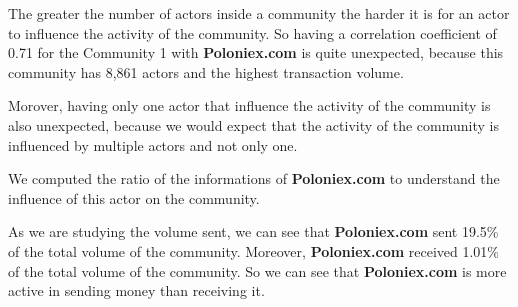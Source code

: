 \documentclass[a4paper, 12pt]{article}
\begin{document}
The greater the number of actors inside a community the harder it is for an actor to influence the activity of the community.
So having a correlation coefficient of 0.71 for the Community 1 with \textbf{Poloniex.com} is quite unexpected, 
because this community has 8,861 actors and the highest transaction volume. 

Morover, having only one actor that influence the activity of the community is also unexpected, because we would expect that
the activity of the community is influenced by multiple actors and not only one. 


\begin{table}[!htb]
    \centering
    \caption{Actor Information for Poloniex.com}
    \label{tab:poloniex_community_info}
\end{table}

We computed the ratio of the informations of \textbf{Poloniex.com} to understand the influence of this actor on the community.

\begin{table}[!htb]
    \begin{minipage}{0.5\linewidth}
        As we are studying the volume sent, we can see that \textbf{Poloniex.com} sent 19.5\% of the total volume of the community.
        Moreover, \textbf{Poloniex.com} received 1.01\% of the total volume of the community. So we can see that \textbf{Poloniex.com} 
        is more active in sending money than receiving it.
    \end{minipage}%
    \hspace{0.05\linewidth} %
    \begin{minipage}{0.45\linewidth}
        \centering
        \caption{Ratios for Poloniex.com}
        \label{tab:poloniex_community_info}
    \end{minipage}
\end{table}
\end{document}
